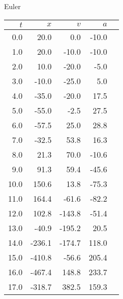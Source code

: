 \documentclass{beamer}
\begin{document}
\begin{minipage}{0.45\textwidth}
{\scriptsize
  Euler
\begin{tabular}{r|rrrr}
$t$ & $x$ & $v$ & $a$ \\\hline
0.0  &  20.0  &  0.0  &  -10.0  &  \\
1.0  &  20.0  &  -10.0  &  -10.0  &  \\
2.0  &  10.0  &  -20.0  &  -5.0  &  \\
3.0  &  -10.0  &  -25.0  &  5.0  &  \\
4.0  &  -35.0  &  -20.0  &  17.5  &  \\
5.0  &  -55.0  &  -2.5  &  27.5  &  \\
6.0  &  -57.5  &  25.0  &  28.8  &  \\
7.0  &  -32.5  &  53.8  &  16.3  &  \\
8.0  &  21.3  &  70.0  &  -10.6  &  \\
9.0  &  91.3  &  59.4  &  -45.6  &  \\
10.0  &  150.6  &  13.8  &  -75.3  &  \\
11.0  &  164.4  &  -61.6  &  -82.2  &  \\
12.0  &  102.8  &  -143.8  &  -51.4  &  \\
13.0  &  -40.9  &  -195.2  &  20.5  &  \\
14.0  &  -236.1  &  -174.7  &  118.0  &  \\
15.0  &  -410.8  &  -56.6  &  205.4  &  \\
16.0  &  -467.4  &  148.8  &  233.7  &  \\
17.0  &  -318.7  &  382.5  &  159.3  &  \\
\end{tabular}
}
\end{minipage}\hfill
\end{document}

